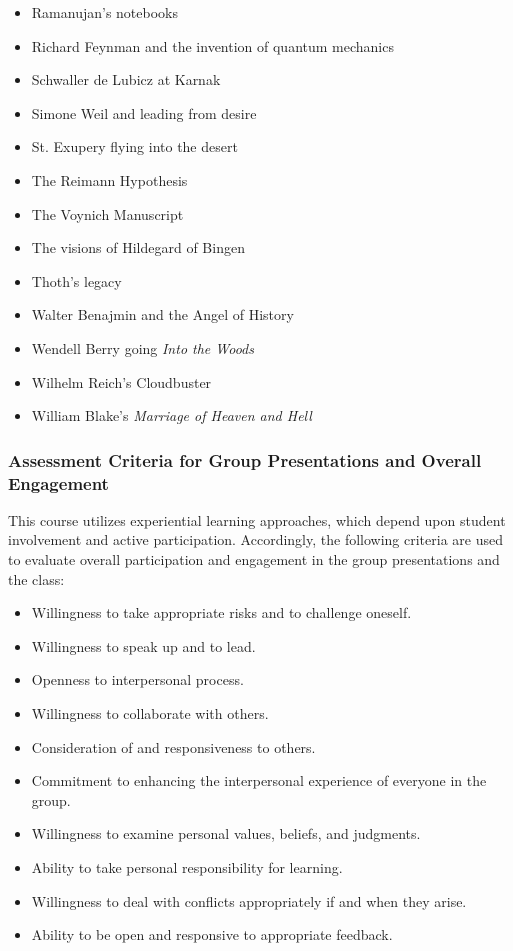 \documentclass[letterpaper,10pt,headsepline]{scrreprt}
\begin{document}
\begin{itemize}
\item Ramanujan's notebooks
\item Richard Feynman and the invention of quantum mechanics
\item Schwaller de Lubicz at Karnak
\item Simone Weil and leading from desire
\item St. Exupery flying into the desert
\item The Reimann Hypothesis
\item The Voynich Manuscript
\item The visions of Hildegard of Bingen
\item Thoth's legacy
\item Walter Benajmin and the Angel of History
\item Wendell Berry going \textit{Into the Woods}
\item Wilhelm Reich's Cloudbuster
\item William Blake's \textit{Marriage of Heaven and Hell}

\end{itemize}


\subsubsection{Assessment Criteria for Group Presentations and Overall Engagement}

This course utilizes experiential learning approaches, which depend upon student involvement and active participation. Accordingly, the following criteria are used to evaluate overall participation and engagement in the group presentations and the class:

\begin{itemize}
\item Willingness to take appropriate risks and to challenge oneself.
\item Willingness to speak up and to lead.
\item Openness to interpersonal process.
\item Willingness to collaborate with others.
\item Consideration of and responsiveness to others.
\item Commitment to enhancing the interpersonal experience of everyone in the group.
\item Willingness to examine personal values, beliefs, and judgments.
\item Ability to take personal responsibility for learning.
\item Willingness to deal with conflicts appropriately if and when they arise.
\item Ability to be open and responsive to appropriate feedback.
 
\end{itemize}
\end{document}
